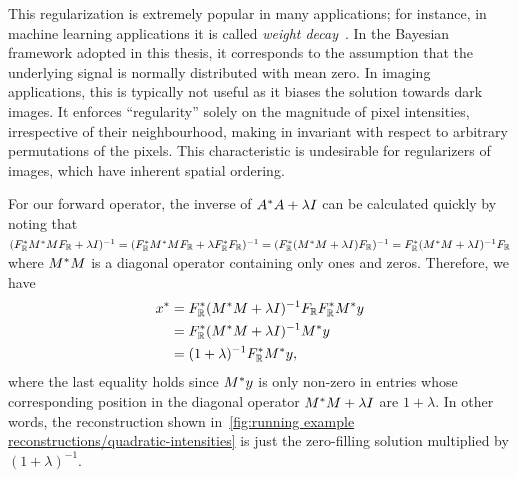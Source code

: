 This regularization is extremely popular in many applications;
for instance, in machine learning applications it is called \emph{weight decay}~\cite[section 5.2.2, section 7.1.1]{goodfellow_deeplearning_2016}.
In the Bayesian framework adopted in this thesis, it corresponds to the assumption that the underlying signal is normally distributed with mean zero.
In imaging applications, this is typically not useful as it biases the solution towards dark images.
It enforces \enquote{regularity} solely on the magnitude of pixel intensities, irrespective of their neighbourhood, making in invariant with respect to arbitrary permutations of the pixels.
This characteristic is undesirable for regularizers of images, which have inherent spatial ordering.

For our forward operator, the inverse of \( A^{\ast} A + \lambda I \) can be calculated quickly by noting that \( (F_{\mathbb{R}}^{\ast}M^{\ast} MF_{\mathbb{R}} + \lambda I)^{-1} = (F_{\mathbb{R}}^{\ast}M^{\ast} MF_{\mathbb{R}} + \lambda F_{\mathbb{R}}^{\ast} F_{\mathbb{R}})^{-1} = (F_{\mathbb{R}}^{\ast}(M^{\ast} M + \lambda I)F_{\mathbb{R}})^{-1} = F_{\mathbb{R}}^{\ast}(M^{\ast} M + \lambda I)^{-1}F_{\mathbb{R}} \) where \( M^{\ast}M \) is a diagonal operator containing only ones and zeros.
Therefore, we have
\begin{equation}
	\begin{aligned}
		{x}^\ast &= F_{\mathbb{R}}^{\ast}(M^{\ast} M + \lambda I)^{-1}F_{\mathbb{R}} F_{\mathbb{R}}^{\ast}M^{\ast}y \\
						  &= F_{\mathbb{R}}^{\ast}(M^{\ast} M + \lambda I)^{-1}M^{\ast}y \\
						  &= (\num{1} + \lambda)^{-1}F_{\mathbb{R}}^{\ast}M^{\ast}y,
	\end{aligned}
\end{equation}
where the last equality holds since \( M^{\ast}y \) is only non-zero in entries whose corresponding position in the diagonal operator \( M^{\ast} M + \lambda I \) are \( 1 + \lambda \).
In other words, the reconstruction shown in~\cref{fig:running example reconstructions/quadratic-intensities} is just the zero-filling solution multiplied by \( (1 + \lambda)^{-1} \).

